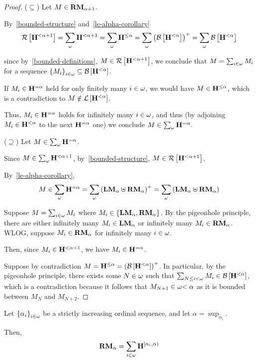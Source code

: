 \begin{proof}
  ($\subseteq$) Let $M \in \mathbf{RM}_{\alpha + 1}$.

  By~\cref{bounded-structure} and~\cref{le-alpha-corollary}
  \[
    \mathcal{R} \left[ {{\mathbf{H}_{}^{< \alpha + 1}}} \right]
    = \sum_{\omega}{\mathbf{H}_{}^{< \alpha + 1}}
    = \sum_{\omega}{\mathbf{H}_{}^{\le \alpha}}
    = \sum_{\omega}{\left( {\mathcal{B} \left[ {{\mathbf{H}_{}^{< \alpha}}} \right]} \right)^+}
    = \sum_{\omega}{\mathcal{B} \left[ {{\mathbf{H}_{}^{< \alpha}}} \right]}
  \]

  since by~\cref{bounded-definitions}, $M \in \mathcal{R} \left[ {{\mathbf{H}_{}^{< \alpha + 1}}} \right]$,
  we conclude that $M = \sum_{i \in \omega}{M_i}$ for a sequence
  $\left\{ {M_i} \right\}_{i \in \omega} \subseteq \mathcal{B} \left[ {{\mathbf{H}_{}^{< \alpha}}} \right]$.

  If $M_i \in \mathbf{H}_{}^{= \alpha}$ held for only finitely many $i \in \omega$,
  we would have $M \in \mathbf{H}_{}^{\le \alpha}$, which is a contradiction
  to $M \notin \mathcal{L} \left[ {{\mathbf{H}_{}^{< \alpha}}} \right]$.

  Thus, $M_i \in \mathbf{H}_{}^{= \alpha}$ holds
  for infinitely many $i \in \omega$, and thus (by adjoining $M_i \in \mathbf{H}_{}^{< \alpha}$
  to the next $\mathbf{H}_{}^{= \alpha}$ one) we conclude $M \in \sum_{\omega}{\mathbf{H}_{}^{= \alpha}}$.

  ($\supseteq$) Let $M \in \sum_{\omega}{\mathbf{H}_{}^{= \alpha}}$.

  Since $M \in \sum_{\omega} {\mathbf{H}_{}^{< \alpha + 1}}$, by~\cref{bounded-structure},
  $M \in \mathcal{R} \left[ {{\mathbf{H}_{}^{< \alpha + 1}}} \right]$.

  By~\cref{le-alpha-corollary},
  \[
    M \in \sum_{\omega}{\mathbf{H}_{}^{= \alpha}}
    = \sum_{\omega} \left( { \mathbf{LM}_{\alpha} \uplus \mathbf{RM}_{\alpha} } \right)^+
    = \sum_{\omega} \left( { \mathbf{LM}_{\alpha} \uplus \mathbf{RM}_{\alpha} } \right)
  \]

  Suppose $M = \sum_{i \in \omega}{M_i}$ where $M_i \in \left\{ {\mathbf{LM}_{\alpha}, \mathbf{RM}_{\alpha}} \right\}$.
  By the pigeonhole principle, there are either
  infinitely many $M_i \in \mathbf{LM}_{\alpha}$ or infinitely many $M_i \in \mathbf{RM}_{\alpha}$.
  WLOG, suppose $M_i \in \mathbf{RM}_{\alpha}$ for infinitely many $i \in \omega$.

  Then, since $M_i \in \mathbf{H}_{}^{< \alpha + 1}$, we have $M_i \in \mathbf{H}_{}^{= \alpha}$.

  Suppose by contradiction $M = \mathbf{H}_{}^{\le \alpha} = \left( {\mathcal{B} \left[ {{\mathbf{H}_{}^{< \alpha}}} \right]} \right)^+$.
  In particular, by the pigeonhole principle, there exists some $N \in \omega$
  such that $\sum_{N \le i < \omega} M_i \in \mathcal{B} \left[ {{\mathbf{H}_{}^{< \alpha}}} \right]$,
  which is a contradiction because it follows that $M_{N+1} \in \omega{< \alpha}$ as it is bounded
  between $M_N$ and $M_{N+2}$.
\end{proof}

\begin{lemma}\label{right-major-limit-decomposition}
  Let $\left\{ {\alpha_i} \right\}_{i \in \omega}$ be a strictly
  increasing ordinal sequence, and let $\alpha = \sup_{\alpha_i}$.

  Then,
  \[
    \mathbf{RM}_{\alpha} = \sum_{i \in \omega}{\mathbf{H}_{}^{[\alpha_i, \alpha)}}
  \]
\end{lemma}


